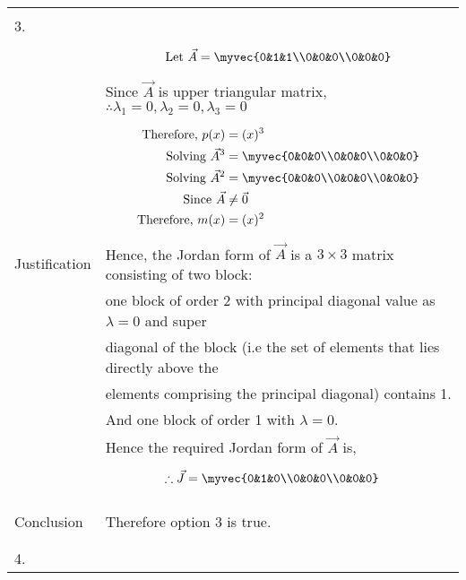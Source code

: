\begin{longtable}{|l|l|}
&\\
3.&\\
&\parbox{6cm}{\begin{align*}
    \mbox{Let }\vec{A}&=\myvec{0&1&1\\0&0&0\\0&0&0}\\
\end{align*}}\\
&Since $\vec{A}$ is upper triangular matrix, $\therefore \lambda_{1}=0,\lambda_{2}=0,\lambda_{3}=0$ \\
&\parbox{6cm}{\begin{align*}
    \mbox{Therefore, }p(x)&=(x)^3\\
    \mbox{Solving }\vec{A}^3&=\myvec{0&0&0\\0&0&0\\0&0&0}\\
    \mbox{Solving }\vec{A}^2&=\myvec{0&0&0\\0&0&0\\0&0&0}\\
    \mbox{Since }\vec{A}&\neq \vec{0}\\
    \mbox{Therefore, }m(x)&=(x)^2\\
    \end{align*}}\\
Justification&Hence, the Jordan form of $\vec{A}$ is a $3 \times 3$ matrix consisting of two block:\\
&one block of order 2 with principal diagonal value as $\lambda = 0$ and super\\
&diagonal of the block (i.e the set of elements that lies directly above the\\
&elements comprising the principal diagonal) contains 1.\\
&And one block of order 1 with $\lambda=0$.\\
&Hence the required Jordan form of $\vec{A}$ is,\\
&\parbox{6cm}{\begin{align*}
    \therefore \vec{J}&=\myvec{0&1&0\\0&0&0\\0&0&0}
\end{align*}}\\
&\\
\hline
&\\
Conclusion&Therefore option 3 is true.\\
&\\
\hline
\pagebreak
\hline
&\\
4.&\\

\end{longtable}
